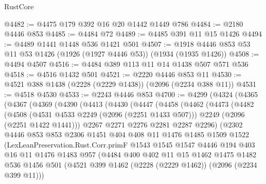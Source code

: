 \begin{lexlean}{RustCore}
\begin{coremodule}
@4482 := @4475 @179 @392 @16 @20 @1442 @1449 @786
@4484 := @2180 @4446 @853
@4485 := @4484 @72
@4489 := @4485 @391 @11 @15 @1426
@4494 := @4489 @1441 @1448 @536 @1421 @501
@4507 := @1918 @4446 @853 @53 @11 @53 @1426 (@1926 (@1927 @4446 @53)) (@1934 (@1935 @1426))
@4508 := @4494 @4507
@4516 := @4484 @389 @113 @11 @14 @1438 @507 @571 @536
@4518 := @4516 @1432 @501
@4521 := @2220 @4446 @853 @11
@4530 := @4521 @388 @1438 (@2228 (@2229 @1438)) (@2096 (@2234 @388 @11))
@4531 := @4518 @4530
@4533 := @2243 @4446 @853
@4700 := @4299
    (@4324
      (@4365
        (@4367
          (@4369
            (@4390
              (@4413
                (@4430
                  (@4447
                    (@4458
                      (@4462
                        (@4473
                          (@4482
                            (@4508
                              (@4531 @4533 @2249 (@2096 (@2251 @1433 @507)))
                              @2249
                              (@2096 (@2251 @1422 @1441)))
                            @2267
                            @2271
                            @2276
                            @2281
                            @2287
                            @2296)
                          (@2302
                            @4446
                            @853
                            @853
                            @2306
                            @1451
                            @404
                            @408
                            @11
                            @1476
                            @1485
                            @1509
                            @1522
                            (LexLeanPreservation.Rust.Corr.primF
                              @1543
                              @1545
                              @1547
                              @4446
                              @194
                              @403
                              @16
                              @11
                              @1476
                              @1483
                              @957
                              (@4484
                                @400
                                @402
                                @11
                                @15
                                @1462
                                @1475
                                @1482
                                @536
                                @1456
                                @501
                                (@4521 @399 @1462 (@2228 (@2229 @1462)) (@2096 (@2234 @399 @11)))

\end{coremodule}
\end{lexlean}
